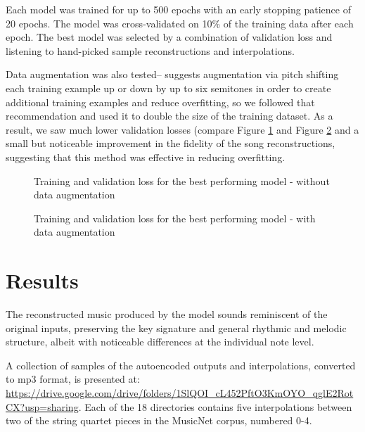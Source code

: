 \documentclass[sigconf,authorversion]{acmart}
\begin{document}
Each model was trained for up to 500 epochs with an early stopping
patience of 20 epochs. The model was cross-validated on 10\% of the
training data after each epoch. The best model was selected by a
combination of validation loss and listening to hand-picked sample
reconstructions and interpolations.

Data augmentation was also tested--\cite{oore_this_2018} suggests
augmentation via pitch shifting each training example up or down by up
to six semitones in order to create additional training examples and
reduce overfitting, so we followed that recommendation and used it to
double the size of the training dataset. As a result, we saw much
lower validation losses (compare Figure \ref{loss} and Figure
\ref{loss_augment} and a small but noticeable improvement in the
fidelity of the song reconstructions, suggesting that this method was
effective in reducing overfitting.

\begin{figure}[htbp]
    \begin{center}
        \scalebox{0.5}{}
    \end{center}
    \caption{Training and validation loss for the best performing model - without data augmentation}
    \label{loss}
\end{figure}

\begin{figure}[htbp]
    \begin{center}
        \scalebox{0.5}{}
    \end{center}
    \caption{Training and validation loss for the best performing model - with data augmentation}
    \label{loss_augment}
\end{figure}


\section{Results}

The reconstructed music produced by the model sounds reminiscent of
the original inputs, preserving the key signature and general rhythmic
and melodic structure, albeit with noticeable differences at the
individual note level.

A collection of samples of the autoencoded outputs and
interpolations, converted to mp3 format, is presented at:
\url{https://drive.google.com/drive/folders/1SlQOI_cL452PftO3KmOYO_qglE2RotCX?usp=sharing}.
Each of the 18 directories contains five interpolations between two of
the string quartet pieces in the MusicNet corpus, numbered 0-4.
\end{document}
